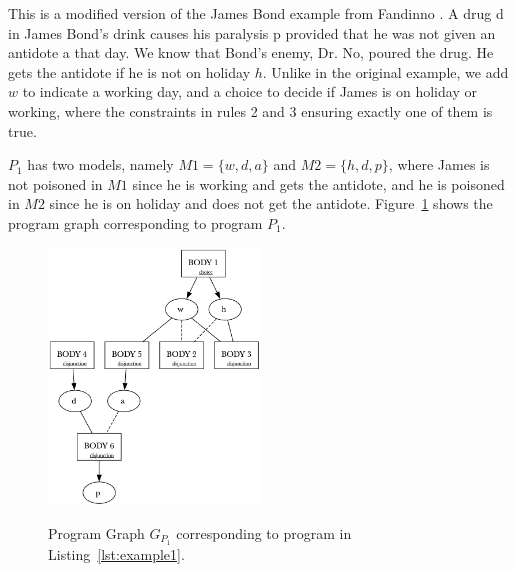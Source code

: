 %
\begin{example}
  This is a modified version of the James Bond example from Fandinno
  .
  A drug d in James Bond’s drink causes his paralysis p provided that he was not given an antidote a that day.
  We know that Bond’s enemy, Dr. No, poured the drug. He gets the antidote if he is not on holiday $h$.
  Unlike in the original example, we add $w$ to indicate a working day,
  and a choice to decide if James is on holiday or working,
  where the constraints in rules 2 and 3 ensuring exactly one of them is true.
  
  $P_1$ has two models, namely $M1 = \{w, d, a\}$ and $M2 = \{h, d, p\}$,
  where James is not poisoned in $M1$ since he is working and gets the antidote, and he is poisoned in $M2$ since he is on holiday and does not get the antidote.
  Figure~\ref{fig:program-graph} shows the program graph corresponding to program $P_1$.
  \begin{figure}
    \centering
    \includegraphics[width=0.5\textwidth]{resources/pg.png}
    \label{fig:program-graph}
    \caption{Program Graph $G_{P_{1}}$ corresponding to program in Listing~\ref{lst:example1}. }
  \end{figure}

\end{example}
